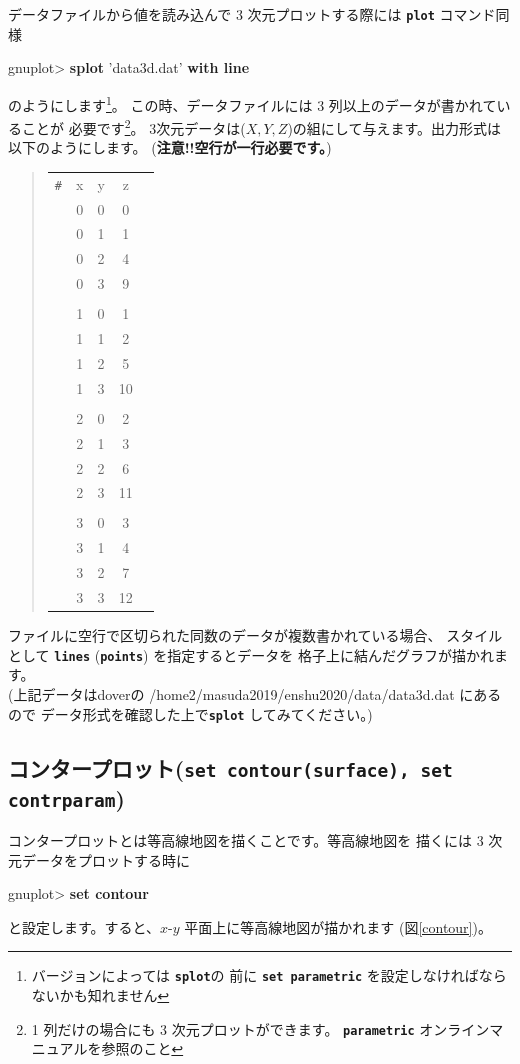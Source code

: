 \documentclass[a4j]{ujarticle} %
\newenvironment{terminal}{%
  \begin{center}
   \begin{minipage}{.8\textwidth}
    \setlength{\FrameSep}{.5\FrameSep}%
    \begin{framed}\ttfamily\small%
     \setlength\baselineskip{.85\baselineskip}%
}{%
    \end{framed}
   \end{minipage}
  \end{center}%
}
\begin{document}
データファイルから値を読み込んで 3 次元プロットする際には
{\tt\bf plot} コマンド同様
\begin{terminal}
gnuplot> {\bf splot} 'data3d.dat' {\bf with line}
\end{terminal}
のようにします\footnote{バージョンによっては {\tt\bf splot}の
前に {\tt\bf set parametric} を設定しなければならないかも知れません}。
この時、データファイルには 3 列以上のデータが書かれていることが
必要です\footnote{1 列だけの場合にも 3 次元プロットができます。
{\tt\bf parametric} オンラインマニュアルを参照のこと}。
3次元データは($X,Y,Z$)の組にして与えます。出力形式は以下のようにします。
(\textbf{注意!!空行が一行必要です。})
\begin{quote}
 \renewcommand{\arraystretch}{0.7}
\begin{tabular}{lcccc}
{\tt \#} & x & y & z & \\
&  0 & 0 & 0 \\
&  0 & 1 & 1 \\
&  0 & 2 & 4 \\
&  0 & 3 & 9 \\
\\
&  1 & 0 & 1 \\
&  1 & 1 & 2 \\
&  1 & 2 & 5 \\
&  1 & 3 & 10 \\
\\
&  2 & 0 & 2 \\
&  2 & 1 & 3 \\
&  2 & 2 & 6 \\
&  2 & 3 & 11 \\
\\
&  3 & 0 & 3 \\
&  3 & 1 & 4 \\
&  3 & 2 & 7 \\
&  3 & 3 & 12 \\
\end{tabular}
\end{quote}

ファイルに空行で区切られた同数のデータが複数書かれている場合、
スタイルとして {\tt\bf lines} ({\tt\bf points}) を指定するとデータを
格子上に結んだグラフが描かれます。\\
(上記データはdoverの /home2/masuda2019/enshu2020/data/data3d.dat にあるので
データ形式を確認した上で{\tt\bf splot} してみてください。)

\subsection{コンタープロット({\tt\bf set contour(surface), set contrparam})}
コンタープロットとは等高線地図を描くことです。等高線地図を
描くには 3 次元データをプロットする時に
\begin{terminal}
gnuplot> {\bf set contour}
\end{terminal}
と設定します。すると、$x$-$y$ 平面上に等高線地図が描かれます
(図\ref{contour})。
\end{document}
